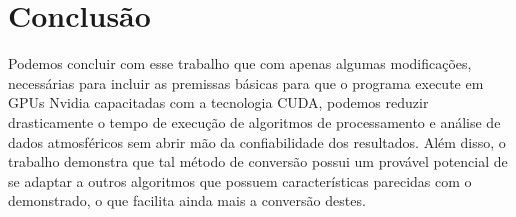 \chapter*{Conclusão}

Podemos concluir com esse trabalho que com apenas algumas modificações, necessárias para incluir as premissas básicas para que o programa execute em GPUs Nvidia capacitadas com a tecnologia CUDA, podemos reduzir drasticamente o tempo de execução de algoritmos de processamento e análise de dados atmosféricos sem abrir mão da confiabilidade dos resultados. Além disso, o trabalho demonstra que tal método de conversão possui um provável potencial de se adaptar a outros algoritmos que possuem características parecidas com o demonstrado, o que facilita ainda mais a conversão destes.